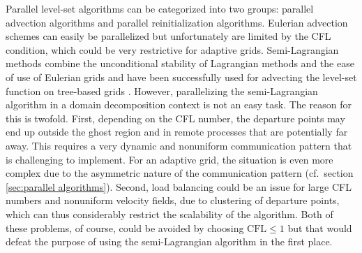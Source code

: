 Parallel level-set algorithms can be categorized into two groups: parallel advection algorithms and parallel reinitialization algorithms. Eulerian advection schemes can easily be parallelized but unfortunately are limited by the CFL condition, which could be very restrictive for adaptive grids. Semi-Lagrangian methods combine the unconditional stability of Lagrangian methods and the ease of use of Eulerian grids and have been successfully used for advecting the level-set function on tree-based grids \cite{Losasso;Gibou;Fedkiw:04:Simulating-Water-and, Losasso;Fedkiw;Osher:06:Spatially-Adaptive-T, Min;Gibou:07:A-second-order-accur}. However, parallelizing the semi-Lagrangian algorithm in a domain decomposition context is not an easy task.
The reason for this is twofold.
First, depending on the CFL number, the departure points may end up outside the
ghost region and in remote processes that are potentially far away.
This requires a very dynamic and nonuniform communication pattern that is
challenging to implement.
For an adaptive grid, the situation is even more complex due to the asymmetric
nature of the communication pattern (cf.\ section \ref{sec:parallel
algorithms}).
Second, load balancing could be an issue for large CFL numbers and nonuniform
velocity fields, due to clustering of departure points, which can thus
considerably restrict the scalability of the algorithm. Both of these problems,
of course, could be avoided by choosing $\text{CFL} \le 1$ but that would
defeat the purpose of using the semi-Lagrangian algorithm in the first place.

